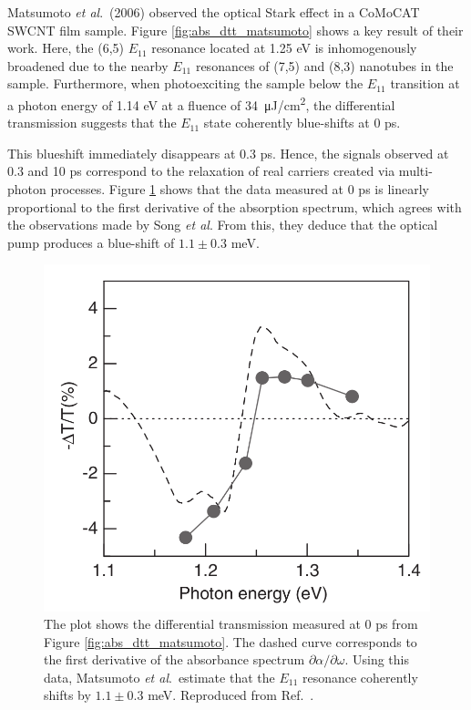 Matsumoto \textit{et al}.\ (2006) observed the optical Stark effect in a CoMoCAT SWCNT film sample. Figure \ref{fig:abs_dtt_matsumoto} shows a key result of their work. Here, the (6,5) $E_{11}$ resonance located at 1.25 eV is inhomogenously broadened due to the nearby $E_{11}$ resonances of (7,5) and (8,3) nanotubes in the sample. Furthermore, when photoexciting the sample below the $E_{11}$ transition at a photon energy of 1.14 eV at a fluence of \SI{34}{\micro \joule / \cm\squared}, the differential transmission suggests that the $E_{11}$ state coherently blue-shifts at 0 ps.

This blueshift immediately disappears at 0.3 ps. Hence, the signals observed at 0.3 and 10 ps correspond to the relaxation of real carriers created via multi-photon processes. Figure \ref{fig:dtt_matsumoto} shows that the data measured at 0 ps is linearly proportional to the first derivative of the absorption spectrum, which agrees with the observations made by Song \textit{et al}. From this, they deduce that the optical pump produces a blue-shift of $1.1 \pm 0.3$ meV.

\begin{figure}[ht]
	\centering
	\includegraphics[scale=0.3]{images/chapter_prior_works/dtt_matsumoto}
	\caption{The plot shows the differential transmission measured at 0 ps from Figure \ref{fig:abs_dtt_matsumoto}. The dashed curve corresponds to the first derivative of the absorbance spectrum $\partial \alpha / \partial \omega$. Using this data, Matsumoto \textit{et al}.\ estimate that the $E_{11}$ resonance coherently shifts by $1.1 \pm 0.3$ meV. Reproduced from Ref.\ \cite{matsumoto2006optical}.}
	\label{fig:dtt_matsumoto}
\end{figure}

